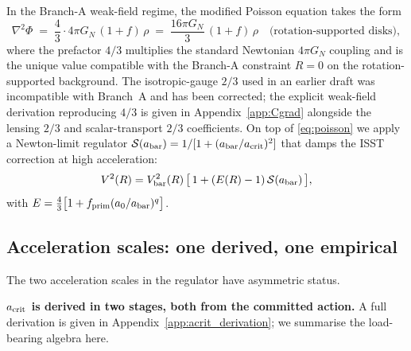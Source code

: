 \documentclass[aps,prd,twocolumn,nofootinbib,floatfix,superscriptaddress]{revtex4-2}
\newcommand{\fprim}{f_{\rm prim}}
\begin{document}
In the Branch-A weak-field regime, the modified Poisson equation
takes the form
\begin{equation}
\label{eq:poisson}
\nabla^2\Phi \;=\; \frac{4}{3}\cdot 4\pi G_N\,(1+f)\,\rho
\;=\; \frac{16\pi G_N}{3}\,(1+f)\,\rho
\quad\text{(rotation-supported disks)},
\end{equation}
where the prefactor $4/3$ multiplies the standard Newtonian
$4\pi G_N$ coupling and is the unique value compatible with the
Branch-A constraint $R=0$ on the rotation-supported background.
The isotropic-gauge $2/3$ used in an earlier draft was
incompatible with Branch~A and has been corrected; the explicit
weak-field derivation reproducing $4/3$ is given in
Appendix~\ref{app:Cgrad} alongside the lensing $2/3$ and
scalar-transport $2/3$ coefficients. On top of
\eqref{eq:poisson} we apply a Newton-limit regulator
$\mathcal S(a_{\rm bar}) = 1/[1+(a_{\rm bar}/a_{\rm crit})^2]$ that
damps the ISST correction at high acceleration:
\begin{equation}
V^2(R) = V_{\rm bar}^2(R)\,
\bigl[\,1+(E(R)-1)\,\mathcal S(a_{\rm bar})\,\bigr],
\end{equation}
with $E = \tfrac{4}{3}\bigl[1+\fprim(a_0/a_{\rm bar})^q\bigr]$.

\subsection{Acceleration scales: one derived, one empirical}
\label{sec:acrit}

The two acceleration scales in the regulator have asymmetric status.

\textbf{$a_{\rm crit}$ is derived in two stages, both from the
committed action.} A full derivation is given in
Appendix~\ref{app:acrit_derivation}; we summarise the load-bearing
algebra here.
\end{document}
